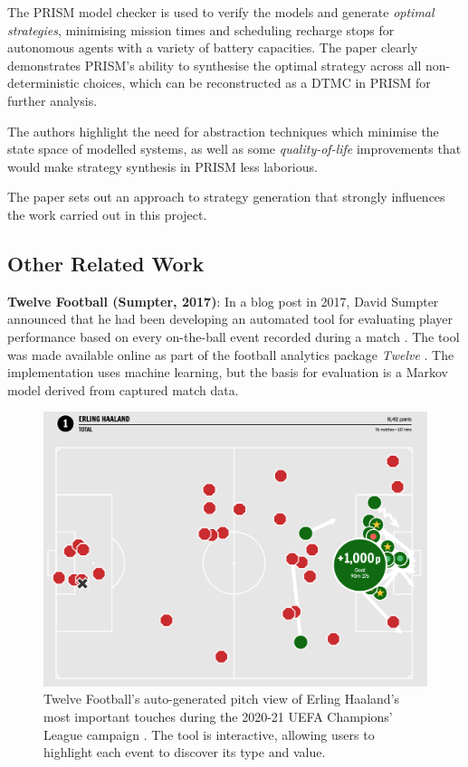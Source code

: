 \documentclass{l4proj}
\begin{document}
The PRISM model checker is used to verify the models and generate \textit{optimal strategies}, minimising mission times and scheduling recharge stops for autonomous agents with a variety of battery capacities. The paper clearly demonstrates PRISM's ability to synthesise the optimal strategy across all non-deterministic choices, which can be reconstructed as a DTMC in PRISM for further analysis. 

The authors highlight the need for abstraction techniques which minimise the state space of modelled systems, as well as some \textit{quality-of-life} improvements that would make strategy synthesis in PRISM less laborious. 

The paper sets out an approach to strategy generation that strongly influences the work carried out in this project.

\subsection{Other Related Work}

\textbf{Twelve Football (Sumpter, 2017)}: In a blog post in 2017, David Sumpter announced that he had been developing an automated tool for evaluating player performance based on every on-the-ball event recorded during a match \cite{sump2}. The tool was made available online as part of the football analytics package \textit{Twelve}  \cite{twel1}. The implementation uses machine learning, but the basis for evaluation is a Markov model derived from captured match data. 

\begin{figure}[h]
    \centering
    \includegraphics[scale=0.2]{images/twelve2.png}   
    \caption{Twelve Football's auto-generated pitch view of Erling Haaland's most important touches during the 2020-21 UEFA Champions' League campaign \cite{twel1}. The tool is interactive, allowing users to highlight each event to discover its type and value.}
    \label{fig:twel} 
\end{figure}
\end{document}
